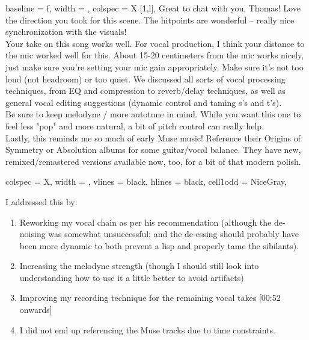 \begin{longtblr}
        {
        baseline = f,
        width = \linewidth,
        colspec = {X [1,l]},
        }
        Great to chat with you, Thomas! Love the direction you took for this scene. The hitpoints are wonderful -- really nice synchronization with the visuals! \\

        Your take on this song works well. For vocal production, I think your distance to the mic worked well for this. About 15-20 centimeters from the mic works nicely, just make sure you're setting your mic gain appropriately. Make sure it's not too loud (not headroom) or too quiet. We discussed all sorts of vocal processing techniques, from EQ and compression to reverb/delay techniques, as well as general vocal editing suggestions (dynamic control and taming s's and t's). \\

        Be sure to keep melodyne / more autotune in mind. While you want this one to feel less "pop" and more natural, a bit of pitch control can really help. \\

        Lastly, this reminds me so much of early Muse music! Reference their Origins of Symmetry or Absolution albums for some guitar/vocal balance. They have new, remixed/remastered versions available now, too, for a bit of that modern polish.

\end{longtblr}

\begin{tblr}
        {
        colspec = {X},
        width = \linewidth,
         vlines = {black},
         hlines = {black},
         cell{1}{odd} = {NiceGray},
        }


    I addressed this by: \\
 \end{tblr}

 \begin{enumerate}
        \item Reworking my vocal chain as per his recommendation (although the de-noising was somewhat unsuccessful; and the de-essing should probably have been more dynamic to both prevent a lisp and properly tame the sibilants).
        \item Increasing the melodyne strength (though I should still look into understanding how to use it a little better to avoid artifacts)
        \item Improving my recording technique for the remaining vocal takes [00:52 onwards]
        \item I did not end up referencing the Muse tracks due to time constraints.
 \end{enumerate}

